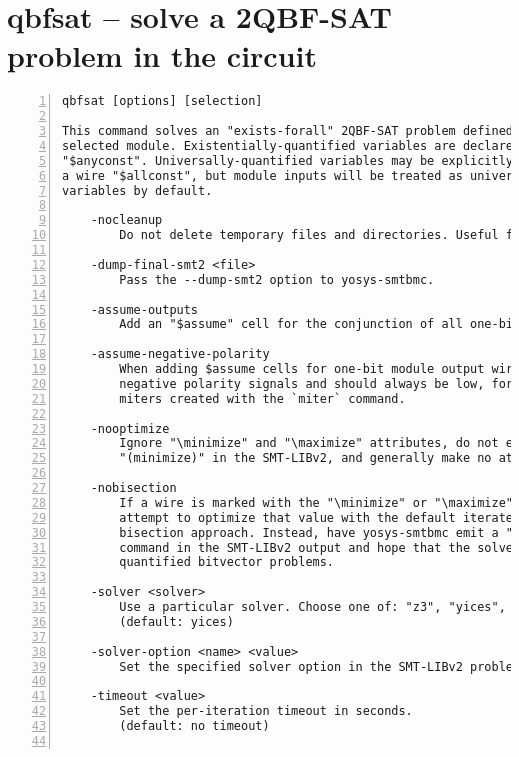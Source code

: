 \section{qbfsat -- solve a 2QBF-SAT problem in the circuit}
\label{cmd:qbfsat}
\begin{lstlisting}[numbers=left,frame=single]
    qbfsat [options] [selection]

This command solves an "exists-forall" 2QBF-SAT problem defined over the currently
selected module. Existentially-quantified variables are declared by assigning a wire
"$anyconst". Universally-quantified variables may be explicitly declared by assigning
a wire "$allconst", but module inputs will be treated as universally-quantified
variables by default.

    -nocleanup
        Do not delete temporary files and directories. Useful for debugging.

    -dump-final-smt2 <file>
        Pass the --dump-smt2 option to yosys-smtbmc.

    -assume-outputs
        Add an "$assume" cell for the conjunction of all one-bit module output wires.

    -assume-negative-polarity
        When adding $assume cells for one-bit module output wires, assume they are
        negative polarity signals and should always be low, for example like the
        miters created with the `miter` command.

    -nooptimize
        Ignore "\minimize" and "\maximize" attributes, do not emit "(maximize)" or
        "(minimize)" in the SMT-LIBv2, and generally make no attempt to optimize anything.

    -nobisection
        If a wire is marked with the "\minimize" or "\maximize" attribute, do not
        attempt to optimize that value with the default iterated solving and threshold
        bisection approach. Instead, have yosys-smtbmc emit a "(minimize)" or "(maximize)"
        command in the SMT-LIBv2 output and hope that the solver supports optimizing
        quantified bitvector problems.

    -solver <solver>
        Use a particular solver. Choose one of: "z3", "yices", and "cvc4".
        (default: yices)

    -solver-option <name> <value>
        Set the specified solver option in the SMT-LIBv2 problem file.

    -timeout <value>
        Set the per-iteration timeout in seconds.
        (default: no timeout)


\end{lstlisting}
